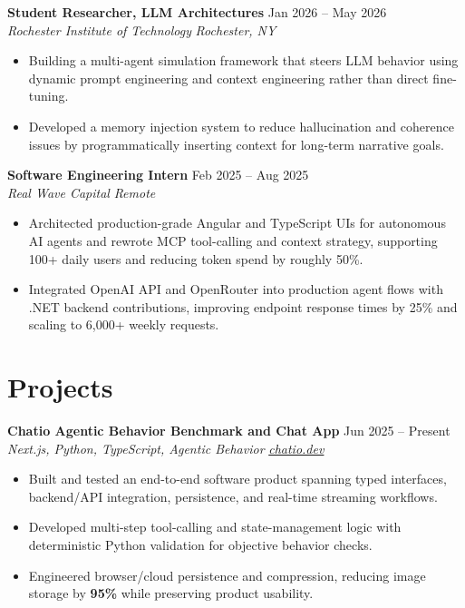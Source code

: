 \documentclass[10pt,letterpaper]{article}
\newif\ifresumeFirstRole
\newcommand{\resumeRole}[4]{%
  \ifresumeFirstRole
    \global\resumeFirstRolefalse
  \else
    \vspace{0pt plus 1fill}%
  \fi
  \textbf{#1} \hfill #2\\
  \textit{#3} \hfill \textit{#4}
}
\begin{document}
\resumeRole{Student Researcher, LLM Architectures}{Jan 2026 -- May 2026}{Rochester Institute of Technology}{Rochester, NY}
\begin{itemize}
  \item Building a multi-agent simulation framework that steers LLM behavior using dynamic prompt engineering and context engineering rather than direct fine-tuning.
  \item Developed a memory injection system to reduce hallucination and coherence issues by programmatically inserting context for long-term narrative goals.
\end{itemize}

\resumeRole{Software Engineering Intern}{Feb 2025 -- Aug 2025}{Real Wave Capital}{Remote}
\begin{itemize}
  \item Architected production-grade Angular and TypeScript UIs for autonomous AI agents and rewrote MCP tool-calling and context strategy, supporting 100+ daily users and reducing token spend by roughly 50\%.
  \item Integrated OpenAI API and OpenRouter into production agent flows with .NET backend contributions, improving endpoint response times by 25\% and scaling to 6,000+ weekly requests.
\end{itemize}

\section*{Projects}
\resumeRole{Chatio Agentic Behavior Benchmark and Chat App}{Jun 2025 -- Present}{Next.js, Python, TypeScript, Agentic Behavior}{\href{https://chatio.dev}{chatio.dev}}
\begin{itemize}
  \item Built and tested an end-to-end software product spanning typed interfaces, backend/API integration, persistence, and real-time streaming workflows.
  \item Developed multi-step tool-calling and state-management logic with deterministic Python validation for objective behavior checks.
  \item Engineered browser/cloud persistence and compression, reducing image storage by \textbf{95\%} while preserving product usability.
\end{itemize}
\end{document}
